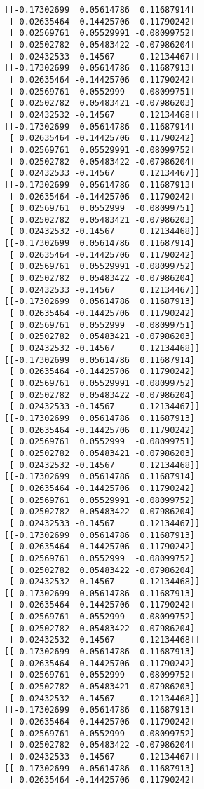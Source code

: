 \documentclass[11pt]{article}
\begin{document}
\begin{Verbatim}[commandchars=\\\{\}]
[[-0.17302699  0.05614786  0.11687914]
 [ 0.02635464 -0.14425706  0.11790242]
 [ 0.02569761  0.05529991 -0.08099752]
 [ 0.02502782  0.05483422 -0.07986204]
 [ 0.02432533 -0.14567     0.12134467]]
[[-0.17302699  0.05614786  0.11687913]
 [ 0.02635464 -0.14425706  0.11790242]
 [ 0.02569761  0.0552999  -0.08099751]
 [ 0.02502782  0.05483421 -0.07986203]
 [ 0.02432532 -0.14567     0.12134468]]
[[-0.17302699  0.05614786  0.11687914]
 [ 0.02635464 -0.14425706  0.11790242]
 [ 0.02569761  0.05529991 -0.08099752]
 [ 0.02502782  0.05483422 -0.07986204]
 [ 0.02432533 -0.14567     0.12134467]]
[[-0.17302699  0.05614786  0.11687913]
 [ 0.02635464 -0.14425706  0.11790242]
 [ 0.02569761  0.0552999  -0.08099751]
 [ 0.02502782  0.05483421 -0.07986203]
 [ 0.02432532 -0.14567     0.12134468]]
[[-0.17302699  0.05614786  0.11687914]
 [ 0.02635464 -0.14425706  0.11790242]
 [ 0.02569761  0.05529991 -0.08099752]
 [ 0.02502782  0.05483422 -0.07986204]
 [ 0.02432533 -0.14567     0.12134467]]
[[-0.17302699  0.05614786  0.11687913]
 [ 0.02635464 -0.14425706  0.11790242]
 [ 0.02569761  0.0552999  -0.08099751]
 [ 0.02502782  0.05483421 -0.07986203]
 [ 0.02432532 -0.14567     0.12134468]]
[[-0.17302699  0.05614786  0.11687914]
 [ 0.02635464 -0.14425706  0.11790242]
 [ 0.02569761  0.05529991 -0.08099752]
 [ 0.02502782  0.05483422 -0.07986204]
 [ 0.02432533 -0.14567     0.12134467]]
[[-0.17302699  0.05614786  0.11687913]
 [ 0.02635464 -0.14425706  0.11790242]
 [ 0.02569761  0.0552999  -0.08099751]
 [ 0.02502782  0.05483421 -0.07986203]
 [ 0.02432532 -0.14567     0.12134468]]
[[-0.17302699  0.05614786  0.11687914]
 [ 0.02635464 -0.14425706  0.11790242]
 [ 0.02569761  0.05529991 -0.08099752]
 [ 0.02502782  0.05483422 -0.07986204]
 [ 0.02432533 -0.14567     0.12134467]]
[[-0.17302699  0.05614786  0.11687913]
 [ 0.02635464 -0.14425706  0.11790242]
 [ 0.02569761  0.0552999  -0.08099752]
 [ 0.02502782  0.05483422 -0.07986204]
 [ 0.02432532 -0.14567     0.12134468]]
[[-0.17302699  0.05614786  0.11687913]
 [ 0.02635464 -0.14425706  0.11790242]
 [ 0.02569761  0.0552999  -0.08099752]
 [ 0.02502782  0.05483422 -0.07986204]
 [ 0.02432532 -0.14567     0.12134468]]
[[-0.17302699  0.05614786  0.11687913]
 [ 0.02635464 -0.14425706  0.11790242]
 [ 0.02569761  0.0552999  -0.08099752]
 [ 0.02502782  0.05483421 -0.07986203]
 [ 0.02432532 -0.14567     0.12134468]]
[[-0.17302699  0.05614786  0.11687913]
 [ 0.02635464 -0.14425706  0.11790242]
 [ 0.02569761  0.0552999  -0.08099752]
 [ 0.02502782  0.05483422 -0.07986204]
 [ 0.02432533 -0.14567     0.12134467]]
[[-0.17302699  0.05614786  0.11687913]
 [ 0.02635464 -0.14425706  0.11790242]

\end{Verbatim}
\end{document}
